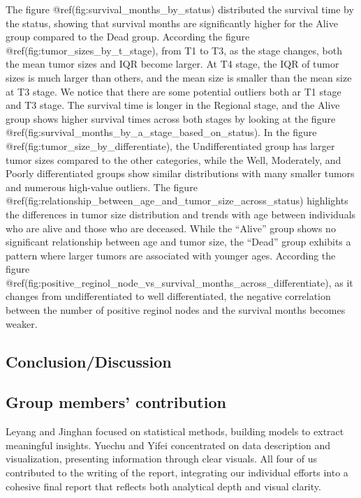\documentclass[
]{article}
\begin{document}
The figure @ref(fig:survival\_months\_by\_status) distributed the survival time by the status, showing that survival months are significantly higher for the Alive group compared to the Dead group. According the figure @ref(fig:tumor\_sizes\_by\_t\_stage), from T1 to T3, as the stage changes, both the mean tumor sizes and IQR become larger. At T4 stage, the IQR of tumor sizes is much larger than others, and the mean size is smaller than the mean size at T3 stage. We notice that there are some potential outliers both ar T1 stage and T3 stage. The survival time is longer in the Regional stage, and the Alive group shows higher survival times across both stages by looking at the figure @ref(fig:survival\_months\_by\_a\_stage\_based\_on\_status). In the figure @ref(fig:tumor\_size\_by\_differentiate), the Undifferentiated group has larger tumor sizes compared to the other categories, while the Well, Moderately, and Poorly differentiated groups show similar distributions with many smaller tumors and numerous high-value outliers. The figure @ref(fig:relationship\_between\_age\_and\_tumor\_size\_across\_status) highlights the differences in tumor size distribution and trends with age between individuals who are alive and those who are deceased. While the ``Alive'' group shows no significant relationship between age and tumor size, the ``Dead'' group exhibits a pattern where larger tumors are associated with younger ages. According the figure @ref(fig:positive\_reginol\_node\_vs\_survival\_months\_across\_differentiate), as it changes from undifferentiated to well differentiated, the negative correlation between the number of positive reginol nodes and the survival months becomes weaker.

\subsection{Conclusion/Discussion}\label{conclusiondiscussion}

\subsection{Group members' contribution}\label{group-members-contribution}

Leyang and Jinghan focused on statistical methods, building models to extract meaningful insights. Yuechu and Yifei concentrated on data description and visualization, presenting information through clear visuals. All four of us contributed to the writing of the report, integrating our individual efforts into a cohesive final report that reflects both analytical depth and visual clarity.
\end{document}

